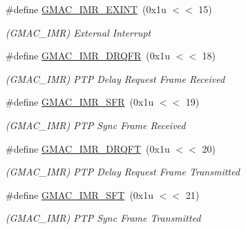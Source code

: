 \begin{DoxyCompactItemize}
\mbox{\label{group__SAME70__GMAC_ga52c451f3353a34b215a4c83e90802ee0}} 
\#define \mbox{\hyperlink{group__SAME70__GMAC_ga52c451f3353a34b215a4c83e90802ee0}{G\+M\+A\+C\+\_\+\+I\+M\+R\+\_\+\+E\+X\+I\+NT}}~(0x1u $<$$<$ 15)
\begin{DoxyCompactList}\small\item\em (G\+M\+A\+C\+\_\+\+I\+MR) External Interrupt \end{DoxyCompactList}\item 
\mbox{\label{group__SAME70__GMAC_ga5130dd10846e8befe28a57f66621a9ee}} 
\#define \mbox{\hyperlink{group__SAME70__GMAC_ga5130dd10846e8befe28a57f66621a9ee}{G\+M\+A\+C\+\_\+\+I\+M\+R\+\_\+\+D\+R\+Q\+FR}}~(0x1u $<$$<$ 18)
\begin{DoxyCompactList}\small\item\em (G\+M\+A\+C\+\_\+\+I\+MR) P\+TP Delay Request Frame Received \end{DoxyCompactList}\item 
\mbox{\label{group__SAME70__GMAC_ga959366c426d9f60f71837a0c8cd741f0}} 
\#define \mbox{\hyperlink{group__SAME70__GMAC_ga959366c426d9f60f71837a0c8cd741f0}{G\+M\+A\+C\+\_\+\+I\+M\+R\+\_\+\+S\+FR}}~(0x1u $<$$<$ 19)
\begin{DoxyCompactList}\small\item\em (G\+M\+A\+C\+\_\+\+I\+MR) P\+TP Sync Frame Received \end{DoxyCompactList}\item 
\mbox{\label{group__SAME70__GMAC_gae805f71830f07a81e460eeda3911152d}} 
\#define \mbox{\hyperlink{group__SAME70__GMAC_gae805f71830f07a81e460eeda3911152d}{G\+M\+A\+C\+\_\+\+I\+M\+R\+\_\+\+D\+R\+Q\+FT}}~(0x1u $<$$<$ 20)
\begin{DoxyCompactList}\small\item\em (G\+M\+A\+C\+\_\+\+I\+MR) P\+TP Delay Request Frame Transmitted \end{DoxyCompactList}\item 
\mbox{\label{group__SAME70__GMAC_gaa70500f5bace97033260ae3065ed8ada}} 
\#define \mbox{\hyperlink{group__SAME70__GMAC_gaa70500f5bace97033260ae3065ed8ada}{G\+M\+A\+C\+\_\+\+I\+M\+R\+\_\+\+S\+FT}}~(0x1u $<$$<$ 21)
\begin{DoxyCompactList}\small\item\em (G\+M\+A\+C\+\_\+\+I\+MR) P\+TP Sync Frame Transmitted \end{DoxyCompactList}\item 
$$
\end{DoxyCompactItemize}
